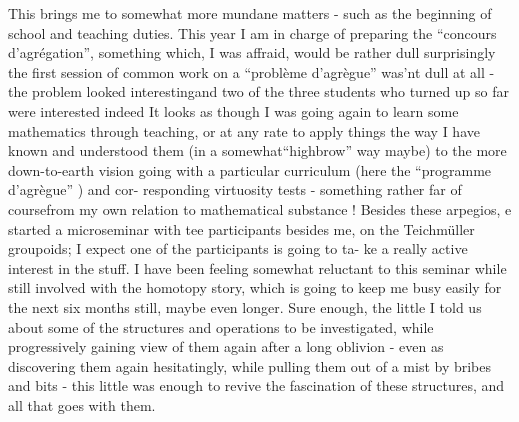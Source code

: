 
This brings me to somewhat more mundane matters - such as the
beginning of school and teaching duties. This year I am  in
charge of preparing the ``concours d'agrégation'', something which, I
was affraid, would be rather dull   surprisingly the first
session of common work on a ``problème d'agrègue'' was'nt dull at all -
the problem looked interesting\hand{,}and  two of the three students who
turned up so far were interested indeed\hand{,}  It looks as though I was going
again to learn some mathematics through teaching, or at any rate 
 to apply things the way I have known and understood them (in a
somewhat``highbrow'' way maybe) to the more down-to-earth vision going
with a particular curriculum (here the ``programme d'agrègue'' ) and cor-%
responding virtuosity tests - something rather far\hand{,} of course\hand{,}from my
own relation to mathematical substance ! Besides these arpegios, e
started a microseminar\unsure{\hand{,}} with tee participants besides me, on the
Teichmüller groupoids; I expect one of the participants is going to ta-%
ke a really active interest in the stuff. I have been feeling somewhat
reluctant to  this seminar while still involved with the
homotopy story, which is going to keep me busy easily for the next
six months still, maybe even longer. Sure enough, the little I told
us about some of the structures and operations to be investigated,
while progressively gaining view of them again after a long oblivion
- even as discovering them again hesitatingly, while pulling them out
of a mist by bribes and bits - this little was enough to revive the
 fascination of these structures, and all that goes with them.


